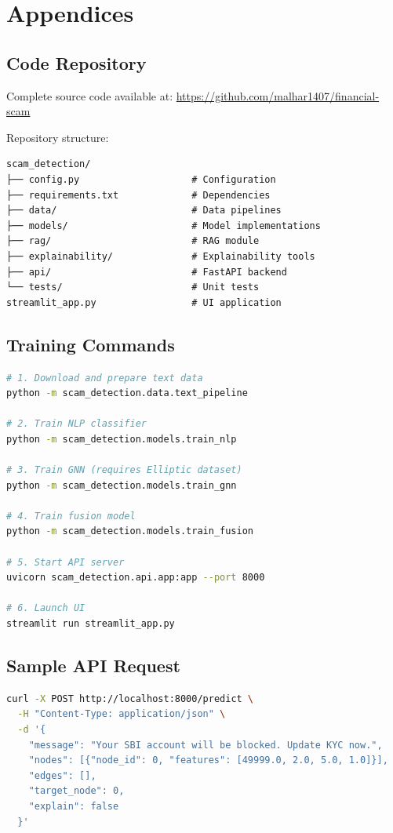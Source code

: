 \section{Appendices}

\subsection{Code Repository}

Complete source code available at: \url{https://github.com/malhar1407/financial-scam}

Repository structure:
\begin{lstlisting}
scam_detection/
├── config.py                    # Configuration
├── requirements.txt             # Dependencies
├── data/                        # Data pipelines
├── models/                      # Model implementations
├── rag/                         # RAG module
├── explainability/              # Explainability tools
├── api/                         # FastAPI backend
└── tests/                       # Unit tests
streamlit_app.py                 # UI application
\end{lstlisting}

\subsection{Training Commands}

\begin{lstlisting}[language=bash]
# 1. Download and prepare text data
python -m scam_detection.data.text_pipeline

# 2. Train NLP classifier
python -m scam_detection.models.train_nlp

# 3. Train GNN (requires Elliptic dataset)
python -m scam_detection.models.train_gnn

# 4. Train fusion model
python -m scam_detection.models.train_fusion

# 5. Start API server
uvicorn scam_detection.api.app:app --port 8000

# 6. Launch UI
streamlit run streamlit_app.py
\end{lstlisting}

\subsection{Sample API Request}

\begin{lstlisting}[language=bash]
curl -X POST http://localhost:8000/predict \
  -H "Content-Type: application/json" \
  -d '{
    "message": "Your SBI account will be blocked. Update KYC now.",
    "nodes": [{"node_id": 0, "features": [49999.0, 2.0, 5.0, 1.0]}],
    "edges": [],
    "target_node": 0,
    "explain": false
  }'
\end{lstlisting}

